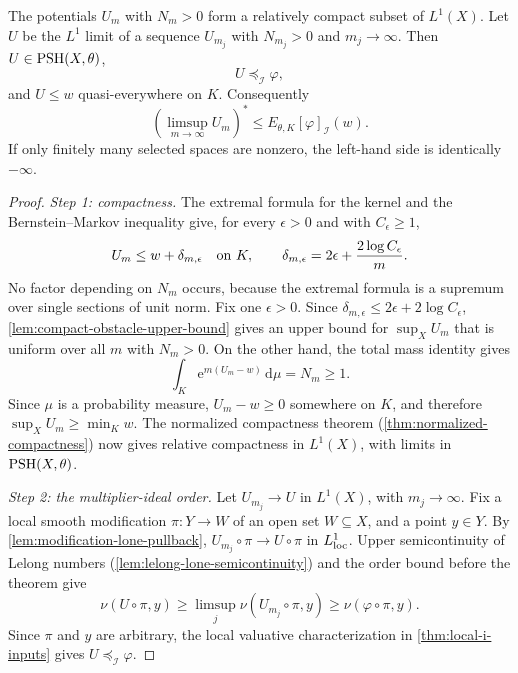\begin{theorem}\label{thm:partial-fubini-study-upper}
The potentials $U_m$ with $N_m>0$ form a relatively compact subset of $L^1(X)$. Let $U$ be the $L^1$ limit of a sequence $U_{m_j}$ with $N_{m_j}>0$ and $m_j\to\infty$. Then $U\in\mathrm{PSH}(X,\theta)$,
\[
 U\preceq_{\mathcal I}\varphi,
\]
and $U\leq w$ quasi-everywhere on $K$. Consequently
\[
 \left(\limsup_{m\to\infty}U_m\right)^*
       \leq E_{\theta,K}[\varphi]_{\mathcal I}(w).
\]
If only finitely many selected spaces are nonzero, the left-hand side is identically $-\infty$.
\end{theorem}
\begin{proof}
\emph{Step 1: compactness.} The extremal formula for the kernel and the Bernstein--Markov inequality give, for every $\epsilon>0$ and with $C_\epsilon\geq1$,
\[
 U_m\leq w+\delta_{m,\epsilon}\quad\hbox{on }K,
 \qquad
 \delta_{m,\epsilon}=2\epsilon+\frac{2\log C_\epsilon}{m}.
\]
No factor depending on $N_m$ occurs, because the extremal formula is a supremum over single sections of unit norm. Fix one $\epsilon>0$. Since $\delta_{m,\epsilon}\leq2\epsilon+2\log C_\epsilon$, \cref{lem:compact-obstacle-upper-bound} gives an upper bound for $\sup_XU_m$ that is uniform over all $m$ with $N_m>0$. On the other hand, the total mass identity gives
\[
 \int_K \mathrm{e}^{m(U_m-w)}\,\mathrm{d}\mu=N_m\geq1.
\]
Since $\mu$ is a probability measure, $U_m-w\geq0$ somewhere on $K$, and therefore $\sup_XU_m\geq\min_Kw$. The normalized compactness theorem (\cref{thm:normalized-compactness}) now gives relative compactness in $L^1(X)$, with limits in $\mathrm{PSH}(X,\theta)$.

\emph{Step 2: the multiplier-ideal order.} Let $U_{m_j}\to U$ in $L^1(X)$, with $m_j\to\infty$. Fix a local smooth modification $\pi\colon Y\to W$ of an open set $W\subseteq X$, and a point $y\in Y$. By \cref{lem:modification-lone-pullback}, $U_{m_j}\circ\pi\to U\circ\pi$ in $L^1_{\mathrm{loc}}$. Upper semicontinuity of Lelong numbers (\cref{lem:lelong-lone-semicontinuity}) and the order bound before the theorem give
\[
 \nu(U\circ\pi,y)
       \geq\limsup_j\nu(U_{m_j}\circ\pi,y)
       \geq\nu(\varphi\circ\pi,y).
\]
Since $\pi$ and $y$ are arbitrary, the local valuative characterization in \cref{thm:local-i-inputs} gives $U\preceq_{\mathcal I}\varphi$.


\end{proof}
